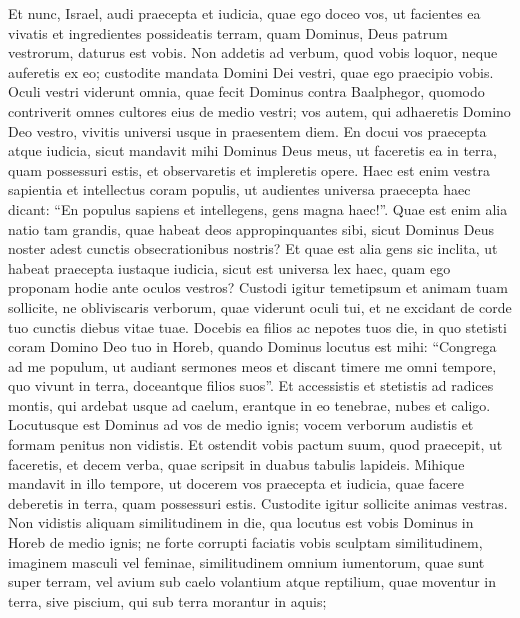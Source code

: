 \begin{biblechapter}
\begin{biblechapter}
\begin{biblechapter}
\begin{biblechapter}
\verse Et nunc, Israel, audi praecepta et iudicia, quae ego doceo vos, ut facientes ea vivatis et ingredientes possideatis terram, quam Dominus, Deus patrum vestrorum, daturus est vobis. 
\verse Non addetis ad verbum, quod vobis loquor, neque auferetis ex eo; custodite mandata Domini Dei vestri, quae ego praecipio vobis. 
\verse Oculi vestri viderunt omnia, quae fecit Dominus contra Baalphegor, quomodo contriverit omnes cultores eius de medio vestri; 
\verse vos autem, qui adhaeretis Domino Deo vestro, vivitis universi usque in praesentem diem. 
\verse En docui vos praecepta atque iudicia, sicut mandavit mihi Dominus Deus meus, ut faceretis ea in terra, quam possessuri estis, 
\verse et observaretis et impleretis opere. Haec est enim vestra sapientia et intellectus coram populis, ut audientes universa praecepta haec dicant: “En populus sapiens et intellegens, gens magna haec!”. 
\verse Quae est enim alia natio tam grandis, quae habeat deos appropinquantes sibi, sicut Dominus Deus noster adest cunctis obsecrationibus nostris? 
\verse Et quae est alia gens sic inclita, ut habeat praecepta iustaque iudicia, sicut est universa lex haec, quam ego proponam hodie ante oculos vestros?
 \verse Custodi igitur temetipsum et animam tuam sollicite, ne obliviscaris verborum, quae viderunt oculi tui, et ne excidant de corde tuo cunctis diebus vitae tuae. Docebis ea filios ac nepotes tuos 
\verse die, in quo stetisti coram Domino Deo tuo in Horeb, quando Dominus locutus est mihi: “Congrega ad me populum, ut audiant sermones meos et discant timere me omni tempore, quo vivunt in terra, doceantque filios suos”. 
\verse Et accessistis et stetistis ad radices montis, qui ardebat usque ad caelum, erantque in eo tenebrae, nubes et caligo. 
\verse Locutusque est Dominus ad vos de medio ignis; vocem verborum audistis et formam penitus non vidistis. 
\verse Et ostendit vobis pactum suum, quod praecepit, ut faceretis, et decem verba, quae scripsit in duabus tabulis lapideis. 
\verse Mihique mandavit in illo tempore, ut docerem vos praecepta et iudicia, quae facere deberetis in terra, quam possessuri estis.
 \verse Custodite igitur sollicite animas vestras. Non vidistis aliquam similitudinem in die, qua locutus est vobis Dominus in Horeb de medio ignis; 
\verse ne forte corrupti faciatis vobis sculptam similitudinem, imaginem masculi vel feminae, 
 \verse similitudinem omnium iumentorum, quae sunt super terram, vel avium sub caelo volantium 
\verse atque reptilium, quae moventur in terra, sive piscium, qui sub terra morantur in aquis; 

\end{biblechapter}
\end{biblechapter}
\end{biblechapter}
\end{biblechapter}
